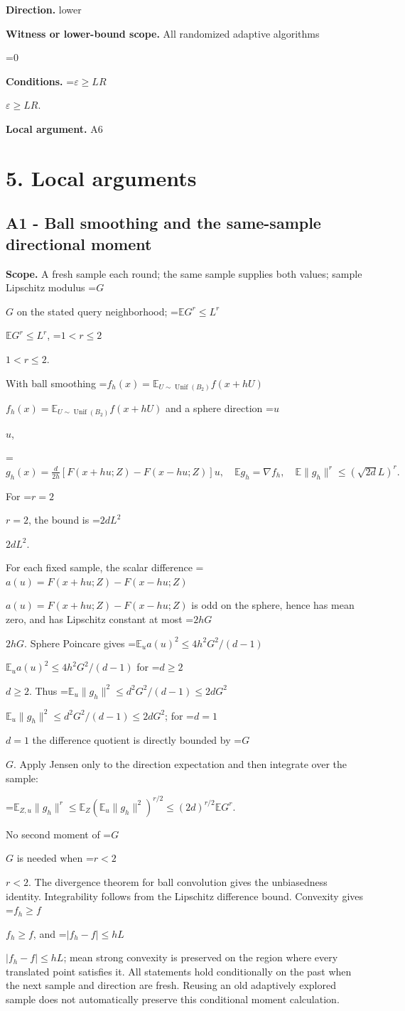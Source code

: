 \documentclass[10pt,a4paper]{article}
\newcommand{\AtlasMath}[1]{\par\begingroup\centering\setbox0=\hbox{$\displaystyle #1$}\ifdim\wd0>1.4\linewidth\typeout{ATLAS WIDE FORMULA: \the\wd0}\fi\ifdim\wd0>\linewidth\resizebox{\linewidth}{!}{\box0}\else\box0\fi\par\endgroup}
\newcommand{\AtlasInlineMath}[1]{\begingroup\setbox0=\hbox{$#1$}\ifdim\wd0>.4\linewidth\endgroup\AtlasMath{#1}\else\endgroup$#1$\fi}
\begin{document}
\textbf{Direction.} lower

\textbf{Witness or lower-bound scope.} All randomized adaptive algorithms

\AtlasMath{0}
\textbf{Conditions.} \AtlasInlineMath{\varepsilon\ge LR}.

\textbf{Local argument.} A6

\section{5. Local arguments}
\subsection{A1 - Ball smoothing and the same-sample directional moment}
\textbf{Scope.} A fresh sample each round; the same sample supplies both values; sample Lipschitz modulus \AtlasInlineMath{G} on the stated query neighborhood; \AtlasInlineMath{\mathbb E G^r\le L^r}, \AtlasInlineMath{1<r\le2}.

With ball smoothing \AtlasInlineMath{f_h(x)=\mathbb E_{U\sim\operatorname{Unif}(B_2)}f(x+hU)} and a sphere direction \AtlasInlineMath{u},

\AtlasMath{g_h(x)=\frac d{2h}[F(x+hu;Z)-F(x-hu;Z)]u,\quad\mathbb E g_h=\nabla f_h,\quad\mathbb E\|g_h\|^r\le(\sqrt{2d}L)^r.}

For \AtlasInlineMath{r=2}, the bound is \AtlasInlineMath{2dL^2}.

For each fixed sample, the scalar difference \AtlasInlineMath{a(u)=F(x+hu;Z)-F(x-hu;Z)} is odd on the sphere, hence has mean zero, and has Lipschitz constant at most \AtlasInlineMath{2hG}. Sphere Poincare gives \AtlasInlineMath{\mathbb E_u a(u)^2\le4h^2G^2/(d-1)} for \AtlasInlineMath{d\ge2}. Thus \AtlasInlineMath{\mathbb E_u\|g_h\|^2\le d^2G^2/(d-1)\le2dG^2}; for \AtlasInlineMath{d=1} the difference quotient is directly bounded by \AtlasInlineMath{G}. Apply Jensen only to the direction expectation and then integrate over the sample:

\AtlasMath{\mathbb E_{Z,u}\|g_h\|^r\le\mathbb E_Z(\mathbb E_u\|g_h\|^2)^{r/2}\le(2d)^{r/2}\mathbb E G^r.}

No second moment of \AtlasInlineMath{G} is needed when \AtlasInlineMath{r<2}. The divergence theorem for ball convolution gives the unbiasedness identity. Integrability follows from the Lipschitz difference bound. Convexity gives \AtlasInlineMath{f_h\ge f}, and \AtlasInlineMath{|f_h-f|\le hL}; mean strong convexity is preserved on the region where every translated point satisfies it. All statements hold conditionally on the past when the next sample and direction are fresh. Reusing an old adaptively explored sample does not automatically preserve this conditional moment calculation.
\end{document}
